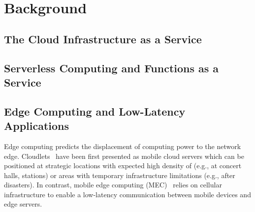 \section{Background}\label{sec:background}

\subsection{The Cloud Infrastructure as a Service}


\subsection{Serverless Computing and Functions as a Service}



\subsection{Edge Computing and Low-Latency Applications}

Edge computing predicts the displacement of computing power to the network edge. Cloudlets~\cite{CLOUDLETS} have been first presented as mobile cloud servers which can be positioned at strategic locations with expected high density of (e.g., at concert halls, stations) or areas with temporary infrastructure limitations (e.g., after disasters). In contrast, mobile edge computing (MEC)~\cite{MEC} relies on cellular infrastructure to enable a low-latency communication between mobile devices and edge servers. 